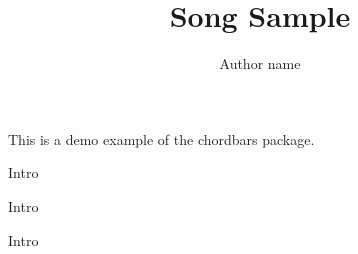 \documentclass[11pt]{article}
\title{Song Sample}
\author{Author name}
\begin{document}
\songtitle

This is a demo example of the chordbars package.

\begin{chordbar}{4}{1}{Intro}
\repeatchord
\end{chordbar}

\begin{chordbar}{4}{1}{Intro}
\repeatchord
\end{chordbar}


\begin{chordbar}{4}{1}{Intro}
\repeatchord
\end{chordbar}
\end{document}
